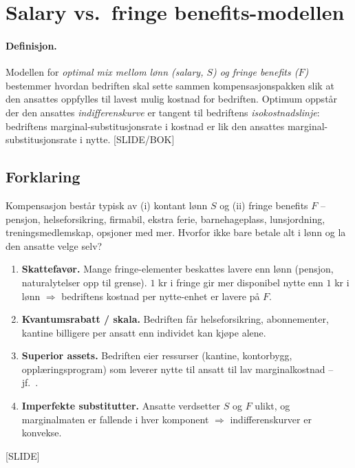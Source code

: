 \section{Salary vs.\ fringe benefits-modellen}\label{thr:salary-fringe-benefits-mix}

\paragraph{Definisjon.} Modellen for \emph{optimal mix mellom lønn (salary, $S$) og fringe benefits ($F$)} bestemmer hvordan bedriften skal sette sammen kompensasjonspakken slik at den ansattes  oppfylles til lavest mulig kostnad for bedriften. Optimum oppstår der den ansattes \emph{indifferenskurve} er tangent til bedriftens \emph{isokostnadslinje}: bedriftens marginal-substitusjonsrate i kostnad er lik den ansattes marginal-substitusjonsrate i nytte. [SLIDE/BOK]

\subsection*{Forklaring}

Kompensasjon består typisk av (i) kontant lønn $S$ og (ii) fringe benefits $F$ -- pensjon, helseforsikring, firmabil, ekstra ferie, barnehageplass, lunsjordning, treningsmedlemskap, opsjoner med mer. Hvorfor ikke bare betale alt i lønn og la den ansatte velge selv?
\begin{enumerate}
\item \textbf{Skattefavør.} Mange fringe-elementer beskattes lavere enn lønn (pensjon, naturalytelser opp til grense). $1$ kr i fringe gir mer disponibel nytte enn $1$ kr i lønn $\Rightarrow$ bedriftens kostnad per nytte-enhet er lavere på $F$.
\item \textbf{Kvantumsrabatt / skala.} Bedriften får helseforsikring, abonnementer, kantine billigere per ansatt enn individet kan kjøpe alene.
\item \textbf{Superior assets.} Bedriften eier ressurser (kantine, kontorbygg, opplæringsprogram) som leverer nytte til ansatt til lav marginalkostnad -- jf.\ .
\item \textbf{Imperfekte substitutter.} Ansatte verdsetter $S$ og $F$ ulikt, og marginalmaten er fallende i hver komponent $\Rightarrow$ indifferenskurver er konvekse.
\end{enumerate}
[SLIDE]

